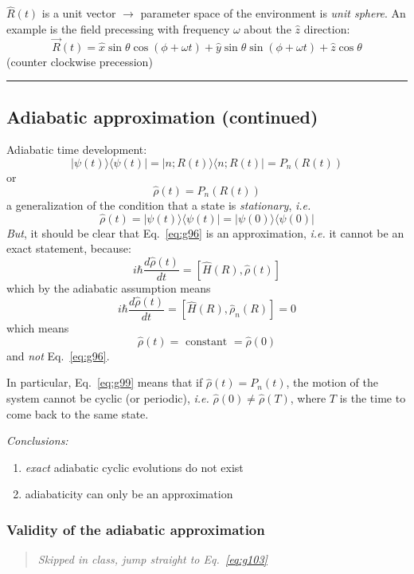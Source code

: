 \documentclass[12pt]{article}
\newcommand{\be}{\begin{equation}}
\newcommand{\ee}{\end{equation}}
\begin{document}
$\hat{R}(t)$ is a unit vector $\rightarrow$ parameter space of the
environment is \emph{unit sphere}.
An example is the field precessing with
frequency $\omega$ about the $\hat{z}$ direction:
\be
\vec{R}(t)=\hat{x} \sin \theta \cos (\phi+\omega t)+ \hat{y} \sin \theta \sin (\phi+\omega t)+\hat{z} \cos \theta
\label{eq:g81}
\ee
(counter clockwise precession)

\rule{\textwidth}{1pt}


\setcounter{subsection}{2}
\subsection{Adiabatic approximation (continued)}
\setcounter{equation}{95}

Adiabatic time development:
\be
|\psi(t)\rangle\langle\psi(t)|=| n ; R(t)\rangle\langle n ; R(t)|=P_{n}(R(t))
\label{eq:g96}
\ee
or
\be
\hat{\rho}(t)=P_{n}(R(t))
\ee
a generalization of the condition that
a state is \emph{stationary}, \textit{i.e.}
\be
\hat{\rho}(t)=|\psi(t)\rangle\langle\psi(t)|=| \psi(0)\rangle\langle\psi(0)|
\ee
\emph{But}, it should be clear that Eq.~\eqref{eq:g96} is an
approximation, \textit{i.e.} it cannot be an exact
statement, because:
\[
i \hbar \frac{d \hat{\rho}(t)}{d t}=[\hat{H}(R), \hat{\rho}(t)]
\]
which by the adiabatic assumption means
\be
i \hbar \frac{d \hat{\rho}(t)}{d t}=\left[\hat{H}(R), \hat{\rho}_{n}(R)\right]=0
\label{eq:g99}
\ee
which means
\be
\hat{\rho}(t) = \text{ constant } = \hat{\rho}(0)
\ee
and \emph{not} Eq.~\eqref{eq:g96}.

In particular, Eq.~\eqref{eq:g99} means that if
$\hat{\rho}(t)=P_{n}(t)$, the motion of the system cannot
be cyclic (or periodic), \textit{i.e.} $\hat{\rho}(0) \neq \hat{\rho}(T)$, where
$T$ is the time to come back to the same state.

\emph{Conclusions:}
\begin{enumerate}
\item \emph{exact} adiabatic cyclic evolutions do not exist
\item adiabaticity can only be an approximation
\end{enumerate}

\setcounter{subsubsection}{2}
\subsubsection{Validity of the adiabatic approximation}

\begin{quote}\emph{Skipped in class, jump straight to Eq.~\eqref{eq:g103}}\end{quote}
\end{document}

